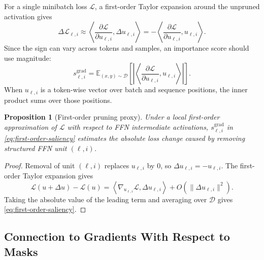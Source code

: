 \documentclass[11pt]{article}
\newtheorem{proposition}{Proposition}
\newcommand{\E}{\mathbb{E}}
\newcommand{\Loss}{\mathcal{L}}
\newcommand{\Data}{\mathcal{D}}
\begin{document}
For a single minibatch loss $\Loss$, a first-order Taylor expansion around the unpruned activation gives
\begin{equation}
  \Delta \Loss_{\ell,i}
  \approx
  \left\langle
    \frac{\partial \Loss}{\partial u_{\ell,i}},
    \Delta u_{\ell,i}
  \right\rangle
  =
  -
  \left\langle
    \frac{\partial \Loss}{\partial u_{\ell,i}},
    u_{\ell,i}
  \right\rangle.
\end{equation}
Since the sign can vary across tokens and samples, an importance score should use magnitude:
\begin{equation}
  s_{\ell,i}^{\mathrm{grad}}
  =
  \E_{(x,y)\sim\Data}
  \left[
    \left|
    \left\langle
      \frac{\partial \Loss}{\partial u_{\ell,i}},
      u_{\ell,i}
    \right\rangle
    \right|
  \right].
  \label{eq:first-order-saliency}
\end{equation}
When $u_{\ell,i}$ is a token-wise vector over batch and sequence positions, the inner product sums over those positions.

\begin{proposition}[First-order pruning proxy]
Under a local first-order approximation of $\Loss$ with respect to FFN intermediate activations, $s_{\ell,i}^{\mathrm{grad}}$ in \eqref{eq:first-order-saliency} estimates the absolute loss change caused by removing structured FFN unit $(\ell,i)$.
\end{proposition}

\begin{proof}
Removal of unit $(\ell,i)$ replaces $u_{\ell,i}$ by $0$, so $\Delta u_{\ell,i}=-u_{\ell,i}$. The first-order Taylor expansion gives
\[
  \Loss(u+\Delta u)-\Loss(u)
  =
  \left\langle \nabla_{u_{\ell,i}}\Loss, \Delta u_{\ell,i}\right\rangle
  +
  O(\|\Delta u_{\ell,i}\|^2).
\]
Taking the absolute value of the leading term and averaging over $\Data$ gives \eqref{eq:first-order-saliency}.
\end{proof}

\subsection{Connection to Gradients With Respect to Masks}
\end{document}
